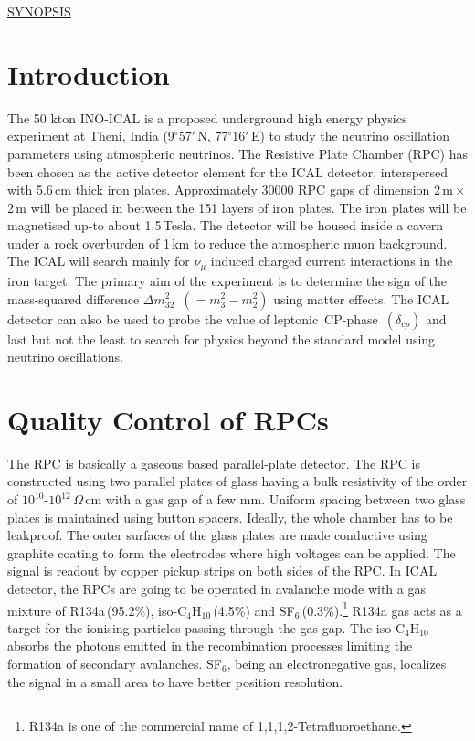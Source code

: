 \begin{center}
  \vspace*{0.5em}
  \large
  \underline{SYNOPSIS}
\end{center}

\normalsize

\doublespacing

\section*{Introduction}
The 50 kton INO-ICAL\cite{inowhite} is a proposed underground high energy physics experiment at Theni, India (9$^\circ$57$'$\,N, 77$^\circ$16$'$\,E) to study the neutrino oscillation parameters using atmospheric neutrinos. The Resistive Plate Chamber (RPC) has been chosen as the active detector element for the ICAL detector, interspersed with 5.6\,cm thick iron plates. Approximately 30000 RPC gaps of dimension 2\,m\,$\times$\,2\,m will be placed in between the 151 layers of iron plates. The iron plates will be magnetised up-to about 1.5\,Tesla. The detector will be housed inside a cavern under a rock overburden of 1\,km to reduce the atmospheric muon background. The ICAL will search mainly for $\nu_{\mu}$ induced charged current interactions in the iron target. The primary aim of the experiment is to determine the sign of the mass-squared difference \mbox{$\Delta m^2_{32}$ $\left(=m^2_3-m^2_2\right)$} using matter effects. The ICAL detector can also be used to probe the value of \mbox{leptonic CP-phase $\left(\delta_{cp}\right)$} and last but not the least to search for physics beyond the standard model using neutrino oscillations. 

\section*{Quality Control of RPCs}

The RPC is basically a gaseous based parallel-plate detector\cite{rpc_p2}. The RPC is constructed using two parallel plates of glass having a bulk resistivity of the order of $10^{10}$-$10^{12}$\,$\Omega$\,cm with a gas gap of a few mm. Uniform spacing between two glass plates is maintained using button spacers. Ideally, the whole chamber has to be leakproof. The outer surfaces of the glass plates are made conductive using graphite coating to form the electrodes where high voltages can be applied. The signal is readout by copper pickup strips on both sides of the RPC. In ICAL detector, the RPCs are going to be operated in avalanche mode with a gas mixture of R134a\,(95.2\%), iso-C$_4$H$_{10}$\,(4.5\%) and SF$_6$\,(0.3\%).\footnote{R134a is one of the commercial name of 1,1,1,2-Tetrafluoroethane.} R134a gas acts as a target for the ionising particles passing through the gas gap. The iso-C$_4$H$_{10}$ absorbs the photons emitted in the recombination processes limiting the formation of secondary avalanches. SF$_6$, being an electronegative gas, localizes the signal in a small area to have better position resolution.

